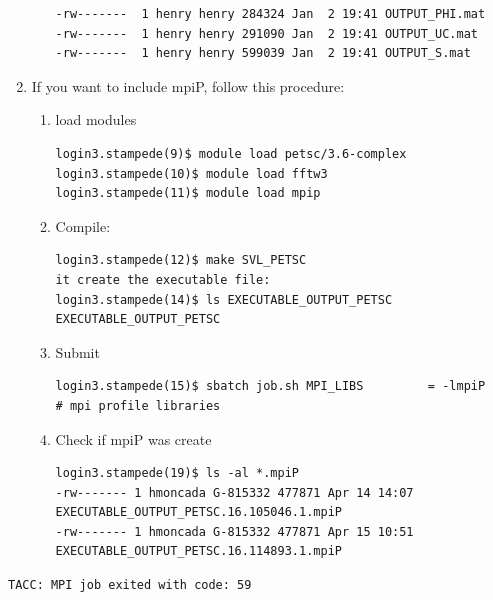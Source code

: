 \documentclass{article}
\begin{document}
\begin{enumerate}
\begin{enumerate}
\scriptsize
\begin{verbatim}
-rw-------  1 henry henry 284324 Jan  2 19:41 OUTPUT_PHI.mat
-rw-------  1 henry henry 291090 Jan  2 19:41 OUTPUT_UC.mat
-rw-------  1 henry henry 599039 Jan  2 19:41 OUTPUT_S.mat
\end{verbatim}
\normalsize
\end{enumerate}
\item  If you want to include mpiP, follow this procedure:
\begin{enumerate}
 \item  load modules
 \scriptsize
\begin{verbatim}
login3.stampede(9)$ module load petsc/3.6-complex
login3.stampede(10)$ module load fftw3
login3.stampede(11)$ module load mpip
\end{verbatim}
\normalsize
\item Compile:
\scriptsize
\begin{verbatim}
login3.stampede(12)$ make SVL_PETSC
it create the executable file:
login3.stampede(14)$ ls EXECUTABLE_OUTPUT_PETSC
EXECUTABLE_OUTPUT_PETSC
\end{verbatim}
\normalsize
\item Submit
\scriptsize
\begin{verbatim}
login3.stampede(15)$ sbatch job.sh MPI_LIBS         = -lmpiP     # mpi profile libraries
\end{verbatim}
\normalsize
\item  Check if mpiP was create
\scriptsize
\begin{verbatim}
login3.stampede(19)$ ls -al *.mpiP
-rw------- 1 hmoncada G-815332 477871 Apr 14 14:07 EXECUTABLE_OUTPUT_PETSC.16.105046.1.mpiP
-rw------- 1 hmoncada G-815332 477871 Apr 15 10:51 EXECUTABLE_OUTPUT_PETSC.16.114893.1.mpiP
\end{verbatim}
\normalsize
\end{enumerate}
\end{enumerate}
\scriptsize
\begin{verbatim}
TACC: MPI job exited with code: 59
\end{verbatim}
\normalsize
\newpage
\end{document}
